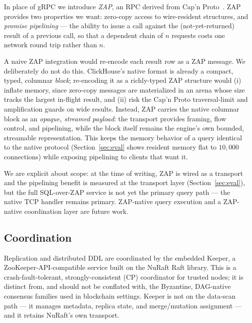 In place of gRPC we introduce \emph{ZAP}, an RPC derived from Cap'n
Proto~\cite{capnproto}. ZAP provides two properties we want: zero-copy access to
wire-resident structures, and \emph{promise pipelining} --- the ability to
issue a call against the (not-yet-returned) result of a previous call, so that
a dependent chain of $n$ requests costs one network round trip rather than $n$.

A naive ZAP integration would re-encode each result row as a ZAP message. We
deliberately do not do this. ClickHouse's native format is already a compact,
typed, columnar \emph{block}; re-encoding it as a richly-typed ZAP structure
would (i) inflate memory, since zero-copy messages are materialized in an arena
whose size tracks the largest in-flight result, and (ii) risk the Cap'n Proto
traversal-limit and amplification guards on wide results. Instead, ZAP carries
the native columnar block as an \emph{opaque, streamed payload}: the transport
provides framing, flow control, and pipelining, while the block itself remains
the engine's own bounded, streamable representation. This keeps the memory
behavior of a query identical to the native protocol (Section~\ref{sec:eval}
shows resident memory flat to $10{,}000$ connections) while exposing
pipelining to clients that want it.

We are explicit about scope: at the time of writing, ZAP is wired as a
transport and the pipelining benefit is measured at the transport layer
(Section~\ref{sec:eval}), but the full SQL-over-ZAP service is not yet the
primary query path --- the native TCP handler remains primary. ZAP-native query
execution and a ZAP-native coordination layer are future work.

\subsection{Coordination}

Replication and distributed DDL are coordinated by the embedded Keeper, a
ZooKeeper-API-compatible service built on the NuRaft Raft library. This is a
crash-fault-tolerant, strongly-consistent (CP) coordinator for trusted nodes;
it is distinct from, and should not be conflated with, the Byzantine,
DAG-native consensus families used in blockchain settings. Keeper is not on the
data-scan path --- it manages metadata, replica state, and merge/mutation
assignment --- and it retains NuRaft's own transport.
